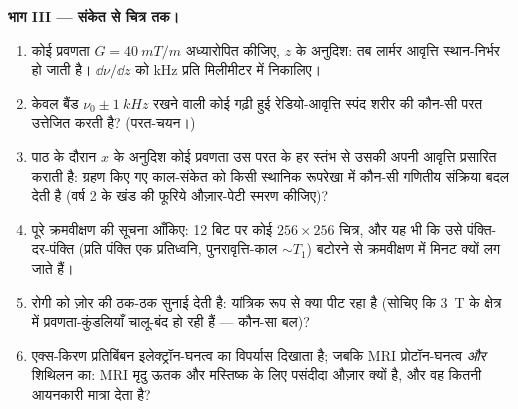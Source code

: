 \begin{problem}
\medskip\noindent\textbf{भाग III --- संकेत से चित्र तक।}
\begin{enumerate}[resume]
  \item कोई प्रवणता $G = \qty{40}{mT/m}$ अध्यारोपित कीजिए, $z$ के
        अनुदिश: तब लार्मर आवृत्ति स्थान-निर्भर हो जाती है।
        $\dd\nu/\dd z$ को kHz प्रति मिलीमीटर में निकालिए।
  \item केवल बैंड $\nu_0 \pm
        \qty{1}{kHz}$ रखने वाली कोई गढ़ी हुई
        रेडियो-आवृत्ति स्पंद शरीर की कौन-सी परत उत्तेजित करती है?
        (परत-चयन।)
  \item पाठ के दौरान $x$ के अनुदिश कोई प्रवणता उस परत के हर स्तंभ से
        उसकी अपनी आवृत्ति प्रसारित कराती है: ग्रहण किए गए काल-संकेत
        को किसी स्थानिक रूपरेखा में कौन-सी गणितीय संक्रिया बदल देती
        है (वर्ष 2 के खंड की फूरिये औज़ार-पेटी स्मरण कीजिए)?
  \item पूरे क्रमवीक्षण की सूचना आँकिए: 12 बिट पर कोई
        $256 \times 256$ चित्र, और यह भी कि उसे पंक्ति-दर-पंक्ति
        (प्रति पंक्ति एक प्रतिध्वनि, पुनरावृत्ति-काल $\sim T_1$)
        बटोरने से क्रमवीक्षण में मिनट क्यों लग जाते हैं।
  \item रोगी को ज़ोर की ठक-ठक सुनाई देती है: यांत्रिक रूप से क्या
        पीट रहा है (सोचिए कि \qty{3}{T} के क्षेत्र में प्रवणता-कुंडलियाँ
        चालू-बंद हो रही हैं --- कौन-सा बल)?
  \item एक्स-किरण प्रतिबिंबन इलेक्ट्रॉन-घनत्व का विपर्यास दिखाता है;
        जबकि MRI प्रोटॉन-घनत्व \emph{और} शिथिलन का: MRI मृदु ऊतक और
        मस्तिष्क के लिए पसंदीदा औज़ार क्यों है, और वह कितनी आयनकारी
        मात्रा देता है?
\end{enumerate}


\end{problem}
